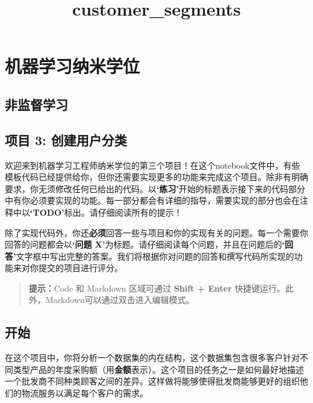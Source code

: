 \documentclass[11pt]{article}
\title{customer\_segments}
\begin{document}
    
    
    \maketitle
    
    

    
    \hypertarget{ux673aux5668ux5b66ux4e60ux7eb3ux7c73ux5b66ux4f4d}{%
\section{机器学习纳米学位}\label{ux673aux5668ux5b66ux4e60ux7eb3ux7c73ux5b66ux4f4d}}

\hypertarget{ux975eux76d1ux7763ux5b66ux4e60}{%
\subsection{非监督学习}\label{ux975eux76d1ux7763ux5b66ux4e60}}

\hypertarget{ux9879ux76ee-3-ux521bux5efaux7528ux6237ux5206ux7c7b}{%
\subsection{项目 3:
创建用户分类}\label{ux9879ux76ee-3-ux521bux5efaux7528ux6237ux5206ux7c7b}}

    欢迎来到机器学习工程师纳米学位的第三个项目！在这个notebook文件中，有些模板代码已经提供给你，但你还需要实现更多的功能来完成这个项目。除非有明确要求，你无须修改任何已给出的代码。以\textbf{`练习'}开始的标题表示接下来的代码部分中有你必须要实现的功能。每一部分都会有详细的指导，需要实现的部分也会在注释中以\textbf{`TODO'}标出。请仔细阅读所有的提示！

除了实现代码外，你还\textbf{必须}回答一些与项目和你的实现有关的问题。每一个需要你回答的问题都会以\textbf{`问题
X'}为标题。请仔细阅读每个问题，并且在问题后的\textbf{`回答'}文字框中写出完整的答案。我们将根据你对问题的回答和撰写代码所实现的功能来对你提交的项目进行评分。

\begin{quote}
\textbf{提示：}Code 和 Markdown 区域可通过 \textbf{Shift + Enter}
快捷键运行。此外，Markdown可以通过双击进入编辑模式。
\end{quote}

    \hypertarget{ux5f00ux59cb}{%
\subsection{开始}\label{ux5f00ux59cb}}

在这个项目中，你将分析一个数据集的内在结构，这个数据集包含很多客户针对不同类型产品的年度采购额（用\textbf{金额}表示）。这个项目的任务之一是如何最好地描述一个批发商不同种类顾客之间的差异。这样做将能够使得批发商能够更好的组织他们的物流服务以满足每个客户的需求。
\end{document}
